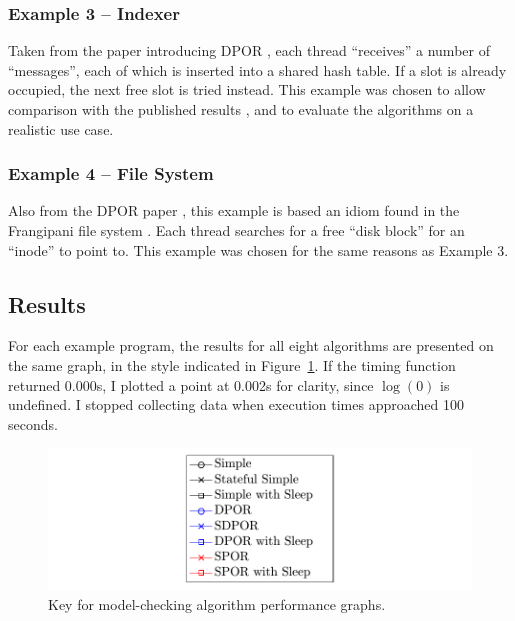 \documentclass[12pt,a4paper,twoside,openany]{report}
\begin{document}
\subsubsection{Example 3 -- Indexer}
Taken from the paper introducing DPOR
\cite[Figure~1]{flan05}, each
thread ``receives'' a number of
``messages'', each of which is inserted
into a shared hash table. If a slot
is already occupied, the
next free slot is tried instead.
This example was chosen to allow
comparison with the published
results \cite[Figure~8]{flan05}, and to evaluate the algorithms
on a realistic use case.

\subsubsection{Example 4 -- File System}
Also from the DPOR paper
\cite[Figure~7]{flan05}, this example is
based an idiom found in the Frangipani file
system \cite{thek97}.
Each thread searches for a free
``disk block'' for an ``inode'' to point
to. This example was chosen for
the same reasons as Example 3.

\subsection{Results}
For each example program, the results for all eight
algorithms are presented on the same graph, in the
style indicated in Figure~\ref{fig:key}.
If the timing function
returned 0.000s, I plotted a point at 0.002s
for clarity, since
$\log(0)$ is undefined.
I stopped collecting data when execution
times approached 100 seconds.

\begin{figure}[h]
	\includegraphics[width=\textwidth]{key}
	\caption{Key for model-checking algorithm performance graphs.}
	\label{fig:key}
\end{figure}
\end{document}
